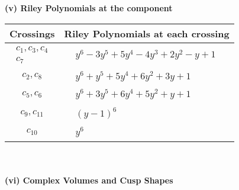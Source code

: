 \documentclass[1p]{elsarticle_modified}
\theoremstyle{definition}
\begin{document}
\newpage\renewcommand{\arraystretch}{1}
\flushleft \textbf{(v) Riley Polynomials at the component}\newline \\
\begin{tabular}{m{50pt}|m{274pt}}
Crossings & \hspace{64pt}Riley Polynomials at each crossing \\
\hline $$\begin{aligned}c_{1},c_{3},c_{4}\\c_{7}\end{aligned}$$&$\begin{aligned}
&y^6-3 y^5+5 y^4-4 y^3+2 y^2- y+1
\end{aligned}$\\
\hline $$\begin{aligned}c_{2},c_{8}\end{aligned}$$&$\begin{aligned}
&y^6+y^5+5 y^4+6 y^2+3 y+1
\end{aligned}$\\
\hline $$\begin{aligned}c_{5},c_{6}\end{aligned}$$&$\begin{aligned}
&y^6+3 y^5+6 y^4+5 y^2+y+1
\end{aligned}$\\
\hline $$\begin{aligned}c_{9},c_{11}\end{aligned}$$&$\begin{aligned}
&(y-1)^6
\end{aligned}$\\
\hline $$\begin{aligned}c_{10}\end{aligned}$$&$\begin{aligned}
&y^6
\end{aligned}$\\
\hline
\end{tabular}\\~\\
\newpage\flushleft \textbf{(vi) Complex Volumes and Cusp Shapes}
\end{document}
